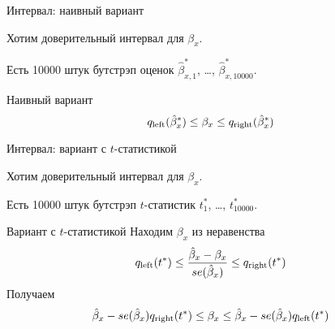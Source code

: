 \begin{frame}{Интервал: наивный вариант}


Хотим доверительный интервал для $\beta_x$.

Есть 10000 штук бутстрэп оценок $\hat \beta^*_{x,1}$, \ldots, $\hat \beta^*_{x, 10000}$.

\pause
\begin{block}{Наивный вариант}
\[
q_{\text{left}}(\hat \beta_x^*) \leq \beta_x \leq q_{\text{right}}(\hat \beta_x^*)
\]
\end{block}


\end{frame}


\begin{frame}{Интервал: вариант с $t$-статистикой}

Хотим доверительный интервал для $\beta_x$.

Есть 10000 штук бутстрэп $t$-статистик
$t^*_{1}$, \ldots, $t^*_{10000}$.


\pause
\begin{block}{Вариант с $t$-статистикой}
Находим $\beta_x$ из неравенства
\[
q_{\text{left}}(t^*) \leq \frac{\hat \beta_x - \beta_x}{se(\hat \beta_x)} \leq q_{\text{right}}(t^*)    
\]
Получаем 
\[
\hat \beta_x  - se(\hat \beta_x) q_{\text{right}}(t^*) \leq \beta_x \leq \hat \beta_x - se(\hat \beta_x) q_{\text{left}}(t^*)      
\]
\end{block}


\end{frame}

  